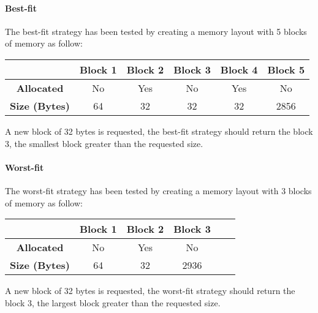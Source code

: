     \paragraph{Best-fit} The best-fit strategy has been tested by creating a memory layout with 5 blocks of memory as follow:

    \begin{table}[h]
    \centering
    \begin{tabular}{|c|c|c|c|c|c|}
    \hline
    & \textbf{Block 1} & \textbf{Block 2} & \textbf{Block 3} & \textbf{Block 4} & \textbf{Block 5} \\
    \hline
    \textbf{Allocated} & No & Yes & No & Yes & No \\
    \textbf{Size (Bytes)} & 64 & 32 & 32 & 32 & 2856 \\
    \hline
    \end{tabular}
    \end{table}

    A new block of 32 bytes is requested, the best-fit strategy should return the block 3, the smallest block greater than the requested size.

    \paragraph{Worst-fit} The worst-fit strategy has been tested by creating a memory layout with 3 blocks of memory as follow:

    \begin{table}[h]
    \centering
    \begin{tabular}{|c|c|c|c|c|c|}
    \hline
    & \textbf{Block 1} & \textbf{Block 2} & \textbf{Block 3} \\
    \hline
    \textbf{Allocated} & No & Yes & No \\
    \textbf{Size (Bytes)} & 64 & 32 & 2936 \\
    \hline
    \end{tabular}
    \end{table}

    A new block of 32 bytes is requested, the worst-fit strategy should return the block 3, the largest block greater than the requested size.